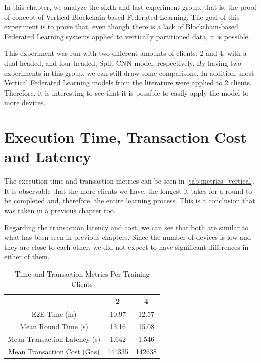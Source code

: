 In this chapter, we analyze the sixth and last experiment group, that is, the proof of concept of Vertical Blockchain-based Federated Learning. The goal of this experiment is to prove that, even though there is a lack of Blockchain-based Federated Learning systems applied to vertically partitioned data, it is possible.

This experiment was run with two different amounts of clients: 2 and 4, with a dual-headed, and four-headed, Split-CNN model, respectively. By having two experiments in this group, we can still draw some comparisons. In addition, most Vertical Federated Learning models from the literature were applied to 2 clients. Therefore, it is interesting to see that it is possible to easily apply the model to more devices.

\section{Execution Time, Transaction Cost and Latency}

The execution time and transaction metrics can be seen in \autoref{tab:metrics_vertical}. It is observable that the more clients we have, the longest it takes for a round to be completed and, therefore, the entire learning process. This is a conclusion that was taken in a previous chapter too.

Regarding the transaction latency and cost, we can see that both are similar to what has been seen in previous chapters. Since the number of devices is low and they are close to each other, we did not expect to have significant differences in either of them.

\begin{table}[!ht]
\begin{tabular}{c|c|c} \hline \hline
                                & 2             & 4             \\ \hline \hline
E2E Time (m)                    & 10.97	        & 12.57         \\ \hline
Mean Round Time (s)             & 13.16	        & 15.08         \\ \hline
Mean Transaction Latency (s)    & 1.642	        & 1.546         \\ \hline
Mean Transaction Cost (Gas)     & 141335        & 142638        \\ \hline
\end{tabular}
\caption{Time and Transaction Metrics Per Training Clients}
\label{tab:metrics_vertical}
\end{table}

